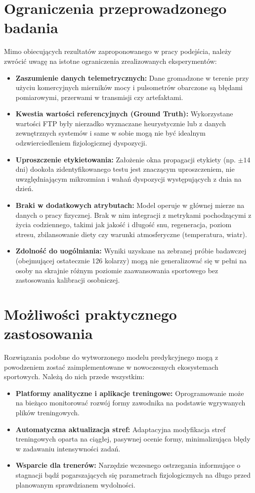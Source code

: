 \section{Ograniczenia przeprowadzonego badania}
Mimo obiecujących rezultatów zaproponowanego w pracy podejścia, należy zwrócić uwagę na istotne ograniczenia zrealizowanych eksperymentów:
\begin{itemize}
    \item \textbf{Zaszumienie danych telemetrycznych:} Dane gromadzone w terenie przy użyciu komercyjnych mierników mocy i pulsometrów obarczone są błędami pomiarowymi, przerwami w transmisji czy artefaktami.
    \item \textbf{Kwestia wartości referencyjnych (Ground Truth):} Wykorzystane wartości FTP były nierzadko wyznaczane heurystycznie lub z danych zewnętrznych systemów i same w sobie mogą nie być idealnym odzwierciedleniem fizjologicznej dyspozycji. 
    \item \textbf{Uproszczenie etykietowania:} Założenie okna propagacji etykiety (np. $\pm 14$ dni) dookoła zidentyfikowanego testu jest znaczącym uproszczeniem, nie uwzględniającym mikrozmian i wahań dyspozycji występujących z dnia na dzień.
    \item \textbf{Braki w dodatkowych atrybutach:} Model operuje w głównej mierze na danych o pracy fizycznej. Brak w nim integracji z metrykami pochodzącymi z życia codziennego, takimi jak jakość i długość snu, regeneracja, poziom stresu, zbilansowanie diety czy warunki atmosferyczne (temperatura, wiatr). 
    \item \textbf{Zdolność do uogólniania:} Wyniki uzyskane na zebranej próbie badawczej (obejmującej ostatecznie 126 kolarzy) mogą nie generalizować się w pełni na osoby na skrajnie różnym poziomie zaawansowania sportowego bez zastosowania kalibracji osobniczej.
\end{itemize}

\section{Możliwości praktycznego zastosowania}
Rozwiązania podobne do wytworzonego modelu predykcyjnego mogą z powodzeniem zostać zaimplementowane w nowoczesnych ekosystemach sportowych. Należą do nich przede wszystkim:
\begin{itemize}
    \item \textbf{Platformy analityczne i aplikacje treningowe:} Oprogramowanie może na bieżąco monitorować rozwój formy zawodnika na podstawie wgrywanych plików treningowych.
    \item \textbf{Automatyczna aktualizacja stref:} Adaptacyjna modyfikacja stref treningowych oparta na ciągłej, pasywnej ocenie formy, minimalizująca błędy w zadawaniu intensywności zadań.
    \item \textbf{Wsparcie dla trenerów:} Narzędzie wczesnego ostrzegania informujące o stagnacji bądź pogarszających się parametrach fizjologicznych na długo przed planowanym sprawdzianem wydolności.
\end{itemize}

